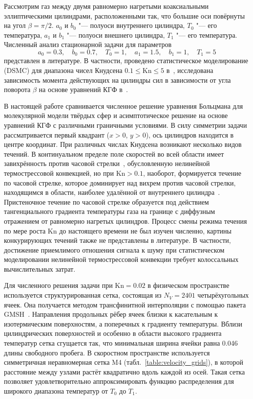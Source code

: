 \documentclass[
aps,%
12pt,%
final,%
notitlepage,%
oneside,%
onecolumn,%
nobibnotes,%
nofootinbib,%
superscriptaddress,%
noshowpacs,%
showkeys,%
floatfix,%
tightenlines,%
centertags]%
{revtex4}
\newcommand{\Kn}{\mathrm{Kn}}
\begin{document}
Рассмотрим газ между двумя равномерно нагретыми коаксиальными эллиптическими цилиндрами,
расположенными так, что большие оси повёрнуты на угол \(\beta=\pi/2\).
\(a_0\) и \(b_0\) "--- полуоси внутреннего цилиндра, \(T_0\) "--- его температура,
\(a_1\) и \(b_1\) "--- полуоси внешнего цилиндра, \(T_1\) "--- его температура.
Численный анализ стационарной задачи для параметров
\[ a_0 = 0.3, \quad b_0 = 0.7, \quad T_0 = 1, \quad a_1 = 1.5, \quad b_1 = 1, \quad T_1 = 5 \]
представлен в литературе.
В частности, проведено статистическое моделирование (DSMC) для диапазона чисел
Кнудсена \(0.1\le\Kn\le5\) в~\cite{Sone1998}, исследована зависимость момента действующих
на цилиндры сил в зависимости от угла поворота \(\beta\) на основе уравнений КГФ в~\cite{Rogozin2014}.

В настоящей работе сравнивается численное решение уравнения Больцмана для молекулярной модели твёрдых сфер
и асимптотическое решение на основе уравнений КГФ с различными граничными условиями.
В силу симметрии задачи рассматривается первый квадрант (\(x>0\), \(y>0\)),
ось цилиндров находится в центре координат.
При различных числах Кнудсена возникают несколько видов течений.
В континуальном пределе поле скоростей во всей области имеет завихрённость против часовой стрелки~\cite{Sone2007,Rogozin2014},
обусловленную нелинейной термострессовой конвекцией,
но при \(\Kn>0.1\), наоборот, формируется течение по часовой стрелке,
которое доминирует над вихрем против часовой стрелки, находящимся в области,
наиболее удалённой от внутреннего цилиндра~\cite{Sone1998}.
Пристеночное течение по часовой стрелке образуется под действием тангенциального градиента температуры газа
на границе с диффузным отражением от равномерно нагретых цилиндров.
Процесс смены режима течения по мере роста \(\Kn\) до настоящего времени не был изучен численно,
картины конкурирующих течений также не представлены в литературе.
В частности, достижение приемлимого отношения сигнала к шуму при статистическом моделировании
нелинейной термострессовой конвекции требует колоссальных вычислительных затрат.

Для численного решения задачи при \(\Kn=0.02\) в физическом пространстве
используется структурированная сетка, состоящая из \(N_V=2401\) четырёхугольных ячеек.
Она получается методом трансфинитной интерполяции с помощью пакета GMSH~\cite{gmsh2009}.
Направления продольных рёбер ячеек близки к касательным к изотермическим поверхностям,
а поперечных к градиенту температуры.
Вблизи цилиндрических поверхностей и особенно в области высокого градиента температур
сетка сгущается так, что минимальная ширина ячейки равна 0.046 длины свободного пробега.
В скоростном пространстве используется симметричная неравномерная сетка M4 (табл.~\ref{table:velocity_grids}),
в которой расстояние между узлами растёт квадратично вдоль каждой из осей.
Такая сетка позволяет удовлетворительно аппроксимировать функцию распределения
для широкого диапазона температур от \(T_0\) до \(T_1\).
\end{document}
